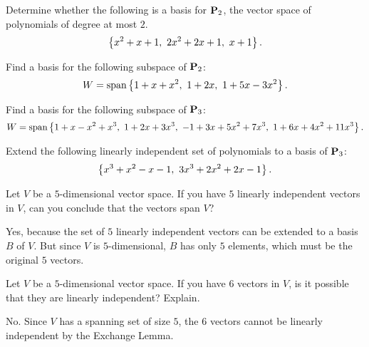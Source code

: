 \begin{ex}
  Determine whether the following is a basis for $\mathbf{P}_{2}$, the
  vector space of polynomials of degree at most $2$.
  \begin{equation*}
    \left\{x^{2}+x+1,~2x^{2}+2x+1,~x+1\right\}.
  \end{equation*}
\end{ex}

\begin{ex}
  Find a basis for the following subspace of $\mathbf{P}_{2}$:
  \begin{equation*}
    W=\sspan\set{1+x+x^{2},~1+2x,~1+5x-3x^{2}}.
  \end{equation*}
\end{ex}

\begin{ex}
  Find a basis for the following subspace of $\mathbf{P}_{3}$:
  \begin{equation*}
    W = \sspan\set{
      1+x-x^{2}+x^{3},~1+2x+3x^{3},~-1+3x+5x^{2}+7x^{3},~1+6x+4x^{2}+11x^{3}}.
  \end{equation*}
\end{ex}

\begin{ex}
  Extend the following linearly independent set of polynomials to a
  basis of $\mathbf{P}_3$:
  \begin{equation*}
    \left\{x^{3}+x^{2}-x-1,~3x^{3}+2x^{2}+2x-1\right\}.
  \end{equation*}
\end{ex}

\begin{ex}
  Let $V$ be a $5$-dimensional vector space.
  If you have $5$ linearly independent vectors in $V$, can you
  conclude that the vectors span $V$?
  \begin{sol}
    Yes, because the set of $5$ linearly independent vectors can be
    extended to a basis $B$ of $V$. But since $V$ is $5$-dimensional,
    $B$ has only $5$ elements, which must be the original $5$ vectors.
  \end{sol}
\end{ex}

\begin{ex}
  Let $V$ be a $5$-dimensional vector space.  If you have $6$ vectors
  in $V$, is it possible that they are linearly independent? Explain.
  \begin{sol}
    No. Since $V$ has a spanning set of size $5$, the $6$ vectors
    cannot be linearly independent by the Exchange Lemma.
  \end{sol}
\end{ex}

